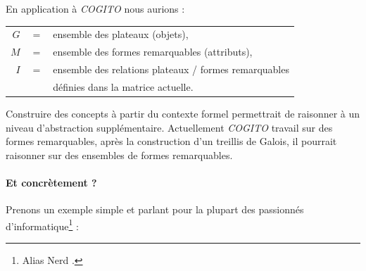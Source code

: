 En application à \emph{COGITO} nous aurions :

\begin{tabular}{r c l}
$G$ & $ = $ & ensemble des plateaux (objets),\\
$M$ & $ = $ & ensemble des formes remarquables (attributs),\\
$I$ & $ = $ & ensemble des relations plateaux / formes remarquables\\
& & définies dans la matrice actuelle.\\
\end{tabular}

Construire des concepts à partir du contexte formel permettrait de raisonner à un niveau d'abstraction supplémentaire. Actuellement \emph{COGITO} travail sur des formes remarquables, après la construction d'un treillis de Galois, il pourrait raisonner sur des ensembles de formes remarquables.

\paragraph{Et concrètement ?}Prenons un exemple simple et parlant pour la plupart des passionnés d'informatique\footnote{Alias \og Nerd \fg{}.} : 

